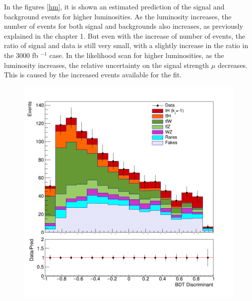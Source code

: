 \begin{linenumbers}
	In the figures \ref{hm}, it is shown an estimated prediction of the signal and background events for higher luminosities. As the luminosity increases, the number of events for both signal and backgrounds also increases, as previously explained in the chapter 1. But even with the increase of number of events, the ratio of signal and data is still very small, with a slightly increase in the ratio in the 3000 fb $^{-1}$ case.  In the likelihood scan for higher luminosities, as the luminosity increases, the relative uncertainty on the signal strength $\mu$ decreases. This is caused by the increased events available for the fit. \\
	
	
	
	\begin{figure}[!htbp]
		\centering
		\begin{minipage}[b]{0.48\textwidth}
			\includegraphics[width=\textwidth]{Chapter4/kt-1/150fb/simple-150-kt-1.png}
		\end{minipage}
		\hfill
		\begin{minipage}[b]{0.48\textwidth}

\end{minipage}
\end{figure}
\end{linenumbers}

